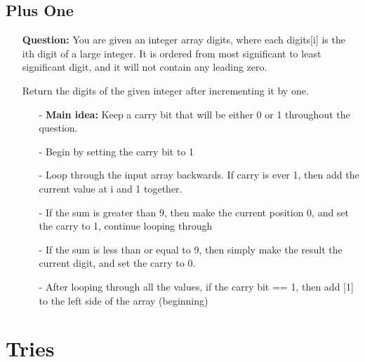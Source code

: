 \documentclass[12pt]{article}
\begin{document}
\subsection{Plus One}
\begin{enumerate}
  \item[] \textbf{Question:} You are given an integer array digits, where each digits[i] is the ith digit of a large integer. It is ordered from most significant to least significant digit, and it will not contain any leading zero.

Return the digits of the given integer after incrementing it by one.
  

    \begin{enumerate}
      \item[-] \textbf{Main idea:} Keep a carry bit that will be either 0 or 1 throughout the question. 
      \item[-] Begin by setting the carry bit to 1
      \item[-] Loop through the input array backwards. If carry is ever 1, then add the current value at i and 1 together. 
      \item[-] If the sum is greater than 9, then make the current position 0, and set the carry to 1, continue looping through
      \item[-] If the sum is less than or equal to 9, then simply make the result the current digit, and set the carry to 0.
      \item[-] After looping through all the values, if the carry bit == 1, then add [1] to the left side of the array (beginning)

    \end{enumerate}
\end{enumerate}


\section{Tries}
\end{document}
